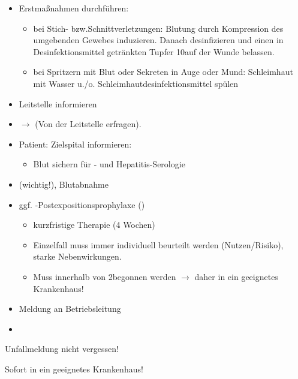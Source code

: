 \label{m:nadelstichverletzung}
\begin{itemize}
    \item Erstmaßnahmen durchführen: \nocite{OeAG2007}
    \begin{itemize}
        \item bei Stich- bzw.Schnittverletzungen:
        Blutung durch Kompression des umgebenden
        Gewebes induzieren. Danach desinfizieren und einen
        in Desinfektionsmittel getränkten Tupfer 10\Min*
        auf der Wunde belassen.
        \item bei Spritzern mit Blut oder Sekreten in Auge oder Mund:
        Schleimhaut mit Wasser u./o. Schleimhautdesinfektionsmittel spülen
    \end{itemize}
    \item Leitstelle informieren
    \item ${\rightarrow}$  (Von der Leitstelle erfragen).
    \item Patient: Zielspital informieren:
    \begin{itemize}
        \item Blut sichern für - und Hepatitis-Serologie
    \end{itemize}
    \item  {}  (wichtig!), Blutabnahme
    \item ggf. -Postexpositionsprophylaxe ()
    \begin{itemize}
        \item kurzfristige Therapie (4 Wochen)
        \item Einzelfall muss immer individuell beurteilt werden
        (Nutzen/Risiko), starke Nebenwirkungen.
        \item Muss innerhalb von 2\Hour* begonnen werden ${\rightarrow}$ daher
        \underline{} in ein geeignetes Krankenhaus!
    \end{itemize}
    \item Meldung an Betriebsleitung
    \item {}
\end{itemize}

\begin{Danger}
  \item Unfallmeldung nicht vergessen!
  
  Sofort in ein geeignetes Krankenhaus!
\end{Danger}
